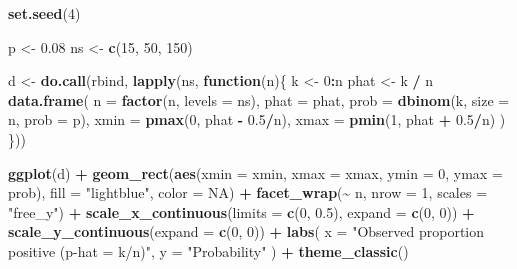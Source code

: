 \documentclass[
]{book}
\newenvironment{Shaded}{\begin{snugshade}}{\end{snugshade}}
\newcommand{\AttributeTok}[1]{\textcolor[rgb]{0.13,0.29,0.53}{#1}}
\newcommand{\ConstantTok}[1]{\textcolor[rgb]{0.56,0.35,0.01}{#1}}
\newcommand{\ControlFlowTok}[1]{\textcolor[rgb]{0.13,0.29,0.53}{\textbf{#1}}}
\newcommand{\DecValTok}[1]{\textcolor[rgb]{0.00,0.00,0.81}{#1}}
\newcommand{\FloatTok}[1]{\textcolor[rgb]{0.00,0.00,0.81}{#1}}
\newcommand{\FunctionTok}[1]{\textcolor[rgb]{0.13,0.29,0.53}{\textbf{#1}}}
\newcommand{\NormalTok}[1]{#1}
\newcommand{\OtherTok}[1]{\textcolor[rgb]{0.56,0.35,0.01}{#1}}
\newcommand{\SpecialCharTok}[1]{\textcolor[rgb]{0.81,0.36,0.00}{\textbf{#1}}}
\newcommand{\StringTok}[1]{\textcolor[rgb]{0.31,0.60,0.02}{#1}}
\begin{document}
\begin{Shaded}
\begin{Highlighting}[]
\FunctionTok{set.seed}\NormalTok{(}\DecValTok{4}\NormalTok{)}

\NormalTok{p }\OtherTok{\textless{}{-}} \FloatTok{0.08}
\NormalTok{ns }\OtherTok{\textless{}{-}} \FunctionTok{c}\NormalTok{(}\DecValTok{15}\NormalTok{, }\DecValTok{50}\NormalTok{, }\DecValTok{150}\NormalTok{)}

\NormalTok{d }\OtherTok{\textless{}{-}} \FunctionTok{do.call}\NormalTok{(rbind, }\FunctionTok{lapply}\NormalTok{(ns, }\ControlFlowTok{function}\NormalTok{(n)\{}
\NormalTok{  k }\OtherTok{\textless{}{-}} \DecValTok{0}\SpecialCharTok{:}\NormalTok{n}
\NormalTok{  phat }\OtherTok{\textless{}{-}}\NormalTok{ k }\SpecialCharTok{/}\NormalTok{ n}
  \FunctionTok{data.frame}\NormalTok{(}
    \AttributeTok{n    =} \FunctionTok{factor}\NormalTok{(n, }\AttributeTok{levels =}\NormalTok{ ns),}
    \AttributeTok{phat =}\NormalTok{ phat,}
    \AttributeTok{prob =} \FunctionTok{dbinom}\NormalTok{(k, }\AttributeTok{size =}\NormalTok{ n, }\AttributeTok{prob =}\NormalTok{ p),}
    \AttributeTok{xmin =} \FunctionTok{pmax}\NormalTok{(}\DecValTok{0}\NormalTok{, phat }\SpecialCharTok{{-}} \FloatTok{0.5}\SpecialCharTok{/}\NormalTok{n),}
    \AttributeTok{xmax =} \FunctionTok{pmin}\NormalTok{(}\DecValTok{1}\NormalTok{, phat }\SpecialCharTok{+} \FloatTok{0.5}\SpecialCharTok{/}\NormalTok{n)}
\NormalTok{  )}
\NormalTok{\}))}

\FunctionTok{ggplot}\NormalTok{(d) }\SpecialCharTok{+}
  \FunctionTok{geom\_rect}\NormalTok{(}\FunctionTok{aes}\NormalTok{(}\AttributeTok{xmin =}\NormalTok{ xmin, }\AttributeTok{xmax =}\NormalTok{ xmax, }\AttributeTok{ymin =} \DecValTok{0}\NormalTok{, }\AttributeTok{ymax =}\NormalTok{ prob),}
            \AttributeTok{fill =} \StringTok{"lightblue"}\NormalTok{, }\AttributeTok{color =} \ConstantTok{NA}\NormalTok{) }\SpecialCharTok{+}
  \FunctionTok{facet\_wrap}\NormalTok{(}\SpecialCharTok{\textasciitilde{}}\NormalTok{ n, }\AttributeTok{nrow =} \DecValTok{1}\NormalTok{, }\AttributeTok{scales =} \StringTok{"free\_y"}\NormalTok{) }\SpecialCharTok{+}
  \FunctionTok{scale\_x\_continuous}\NormalTok{(}\AttributeTok{limits =} \FunctionTok{c}\NormalTok{(}\DecValTok{0}\NormalTok{, }\FloatTok{0.5}\NormalTok{), }\AttributeTok{expand =} \FunctionTok{c}\NormalTok{(}\DecValTok{0}\NormalTok{, }\DecValTok{0}\NormalTok{)) }\SpecialCharTok{+}
  \FunctionTok{scale\_y\_continuous}\NormalTok{(}\AttributeTok{expand =} \FunctionTok{c}\NormalTok{(}\DecValTok{0}\NormalTok{, }\DecValTok{0}\NormalTok{)) }\SpecialCharTok{+}
  \FunctionTok{labs}\NormalTok{(}
    \AttributeTok{x =} \StringTok{"Observed proportion positive (p{-}hat = k/n)"}\NormalTok{,}
    \AttributeTok{y =} \StringTok{"Probability"}
\NormalTok{  ) }\SpecialCharTok{+}
  \FunctionTok{theme\_classic}\NormalTok{()}
\end{Highlighting}
\end{Shaded}
\end{document}
